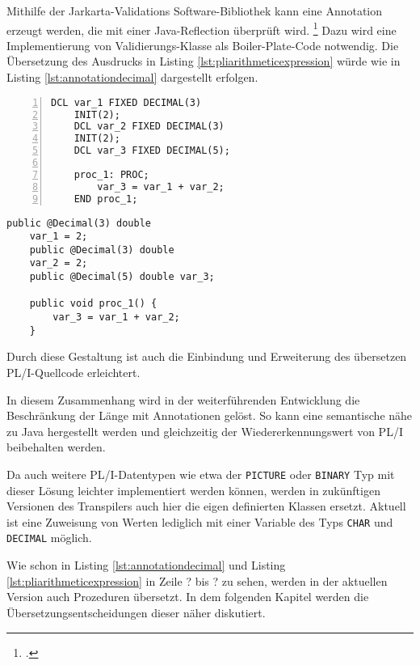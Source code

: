 Mithilfe der Jarkarta-Validations Software-Bibliothek kann eine Annotation erzeugt werden, die mit einer Java-Reflection überprüft wird. \footcite[Vgl. ][]{jakarta}
Dazu wird eine Implementierung von Validierungs-Klasse als Boiler-Plate-Code  notwendig. 
Die Übersetzung des Ausdrucks in Listing \ref{lst:pliarithmeticexpression} würde wie in Listing \ref{lst:annotationdecimal} dargestellt erfolgen.

\begin{minipage}[b]{0.48\linewidth}
	\centering
	\lstset{language=PL/I,label=SliceExaple}
	\begin{lstlisting}[frame=single, numbers=left, mathescape,%
		caption={Transformation DECIMAL}, label={lst:annotationdecimal}]
	DCL var_1 FIXED DECIMAL(3)
	INIT(2);
	DCL var_2 FIXED DECIMAL(3) 
	INIT(2);
	DCL var_3 FIXED DECIMAL(5);
		
	proc_1: PROC;
		var_3 = var_1 + var_2;
	END proc_1;
	\end{lstlisting}
\end{minipage}
\hspace{0.5cm}
\begin{minipage}[b]{0.48\linewidth}
	\centering
	\lstset{language=Java,label=SliceExaple}
	\begin{lstlisting}[frame=single, mathescape,%
		title={" "}]
	public @Decimal(3) double 
	var_1 = 2;
	public @Decimal(3) double 
	var_2 = 2;
	public @Decimal(5) double var_3;
		
	public void proc_1() {
		var_3 = var_1 + var_2;
	}
	\end{lstlisting}
\end{minipage}

Durch diese Gestaltung ist auch die Einbindung und Erweiterung des übersetzen PL/I-Quellcode erleichtert.

In diesem Zusammenhang wird in der weiterführenden Entwicklung die Beschränkung der Länge mit Annotationen gelöst. So kann eine semantische nähe zu Java hergestellt werden und gleichzeitig der Wiedererkennungswert von PL/I beibehalten werden.

Da auch weitere PL/I-Datentypen wie etwa der \verb+PICTURE+ oder \verb+BINARY+ Typ mit dieser Lösung leichter implementiert werden können, werden in zukünftigen Versionen des Transpilers auch hier die eigen definierten Klassen ersetzt.
Aktuell ist eine Zuweisung von Werten lediglich mit einer Variable des Typs \verb+CHAR+ und \verb+DECIMAL+ möglich.

Wie schon in Listing \ref{lst:annotationdecimal} und Listing \ref{lst:pliarithmeticexpression}
in Zeile ? bis ? zu sehen, werden in der aktuellen Version auch Prozeduren übersetzt.
In dem folgenden Kapitel werden die Übersetzungsentscheidungen dieser näher diskutiert.


